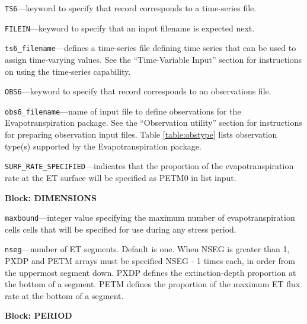 \begin{description}
\item \texttt{TS6}---keyword to specify that record corresponds to a time-series file.

\item \texttt{FILEIN}---keyword to specify that an input filename is expected next.

\item \texttt{ts6\_filename}---defines a time-series file defining time series that can be used to assign time-varying values. See the ``Time-Variable Input'' section for instructions on using the time-series capability.

\item \texttt{OBS6}---keyword to specify that record corresponds to an observations file.

\item \texttt{obs6\_filename}---name of input file to define observations for the Evapotranspiration package. See the ``Observation utility'' section for instructions for preparing observation input files. Table \ref{table:obstype} lists observation type(s) supported by the Evapotranspiration package.

\item \texttt{SURF\_RATE\_SPECIFIED}---indicates that the proportion of the evapotranspiration rate at the ET surface will be specified as PETM0 in list input.

\end{description}
\item \textbf{Block: DIMENSIONS}

\begin{description}
\item \texttt{maxbound}---integer value specifying the maximum number of evapotranspiration cells cells that will be specified for use during any stress period.

\item \texttt{nseg}---number of ET segments.  Default is one.  When NSEG is greater than 1, PXDP and PETM arrays must be specified NSEG - 1 times each, in order from the uppermost segment down. PXDP defines the extinction-depth proportion at the bottom of a segment. PETM defines the proportion of the maximum ET flux rate at the bottom of a segment.

\end{description}
\item \textbf{Block: PERIOD}

